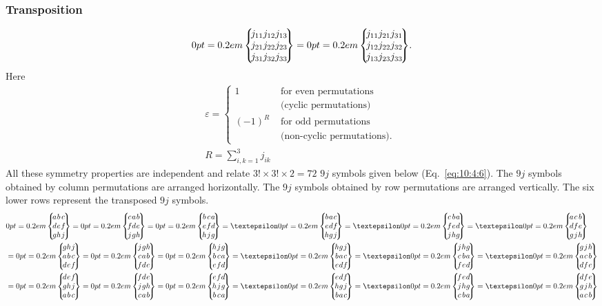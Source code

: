 \subsubsection{Transposition}
\begin{equation}
\ninej{j_{11}}{j_{12}}{j_{13}}{j_{21}}{j_{22}}{j_{23}}{j_{31}}{j_{32}}{j_{33}} =\ninej{j_{11}}{j_{21}}{j_{31}}{j_{12}}{j_{22}}{j_{32}}{j_{13}}{j_{23}}{j_{33}}. \label{eq:10:4:3}
\end{equation}
Here
\begin{gather}
\varepsilon= \begin{cases}1 & \text { for even permutations } \\
& \text { (cyclic permutations) } \\
(-1)^{R} & \text { for odd permutations } \\
& \text { (non-cyclic permutations). }\end{cases}  \label{eq:10:4:4}\\
R=\sum_{i, k=1}^{3} j_{i k} \label{eq:10:4:5}
\end{gather}
All these symmetry properties are independent and relate $3!\times 3!\times 2=72$ $9 j$ symbols given below (Eq.~\eqref{eq:10:4:6}). The $9 j$ symbols obtained by column permutations are arranged horizontally. The $9 j$ symbols obtained by row permutations are arranged vertically. The six lower rows represent the transposed $9 j$ symbols.
\[
\begin{aligned}
& \ninej{a}{b}{c}{d}{e}{f}{g}{h}{j}=\ninej{c}{a}{b}{f}{d}{e}{j}{g}{h}=\ninej{b}{c}{a}{e}{f}{d}{h}{j}{g}=\varepsilon\ninej{b}{a}{c}{e}{d}{f}{h}{g}{j}=\varepsilon\ninej{c}{b}{a}{f}{e}{d}{j}{h}{g}=\varepsilon\ninej{a}{c}{b}{d}{f}{e}{g}{j}{h} \\
& =\ninej{g}{h}{j}{a}{b}{c}{d}{e}{f}=\ninej{j}{g}{h}{c}{a}{b}{f}{d}{e}=\ninej{h}{j}{g}{b}{c}{a}{e}{f}{d}=\varepsilon\ninej{h}{g}{j}{b}{a}{c}{e}{d}{f}=\varepsilon\ninej{j}{h}{g}{c}{b}{a}{f}{e}{d}=\varepsilon\ninej{g}{j}{h}{a}{c}{b}{d}{f}{e} \\
& =\ninej{d}{e}{f}{g}{h}{j}{a}{b}{c}=\ninej{f}{d}{e}{j}{g}{h}{c}{a}{b}=\ninej{e}{f}{d}{h}{j}{g}{b}{c}{a}=\varepsilon\ninej{e}{d}{f}{h}{g}{j}{b}{a}{c}=\varepsilon\ninej{f}{e}{d}{j}{h}{g}{c}{b}{a}=\varepsilon\ninej{d}{f}{e}{g}{j}{h}{a}{c}{b}
\end{aligned}
\]
